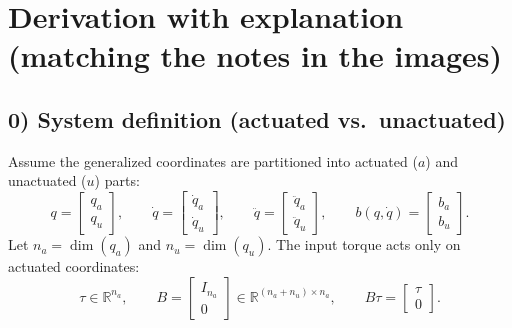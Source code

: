 \section*{Derivation with explanation (matching the notes in the images)}

\subsection*{0) System definition (actuated vs.\ unactuated)}
Assume the generalized coordinates are partitioned into actuated ($a$) and unactuated ($u$) parts:
\begin{equation}
q =
\begin{bmatrix}
q_a\\
q_u
\end{bmatrix},
\qquad
\dot q =
\begin{bmatrix}
\dot q_a\\
\dot q_u
\end{bmatrix},
\qquad
\ddot q =
\begin{bmatrix}
\ddot q_a\\
\ddot q_u
\end{bmatrix},
\qquad
b(q,\dot q)=
\begin{bmatrix}
b_a\\
b_u
\end{bmatrix}.
\end{equation}
Let $n_a=\dim(q_a)$ and $n_u=\dim(q_u)$. The input torque acts only on actuated coordinates:
\begin{equation}
\tau \in \mathbb{R}^{n_a},
\qquad
B =
\begin{bmatrix}
I_{n_a}\\
0
\end{bmatrix}\in \mathbb{R}^{(n_a+n_u)\times n_a},
\qquad
B\tau =
\begin{bmatrix}
\tau\\
0
\end{bmatrix}.
\end{equation}

